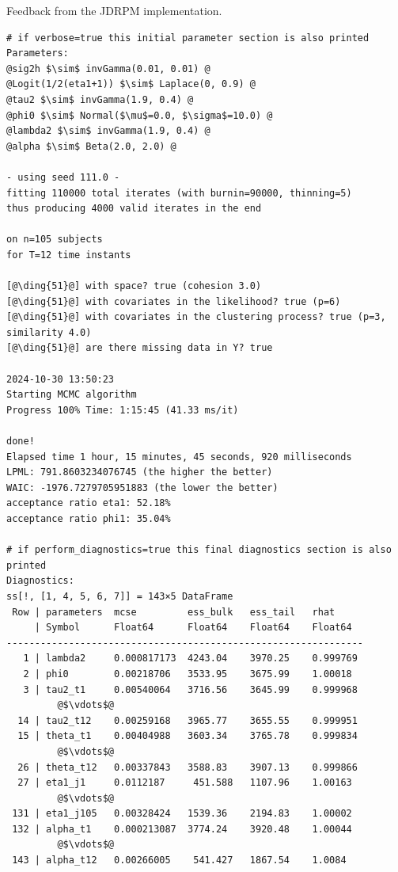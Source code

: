 \documentclass[12pt,	%
	a4paper,		%
	twoside,		%
	openright,		%
	titlepage,%
	]{book}
\theoremstyle{definition}
\newenvironment{code}{\captionsetup{type=listing}}{}
\begin{document}


\begin{code}
\caption[JDRPM interface feedback]{Feedback from the JDRPM implementation.}
    \begin{verbatim}
# if verbose=true this initial parameter section is also printed
Parameters:
@sig2h $\sim$ invGamma(0.01, 0.01) @
@Logit(1/2(eta1+1)) $\sim$ Laplace(0, 0.9) @
@tau2 $\sim$ invGamma(1.9, 0.4) @
@phi0 $\sim$ Normal($\mu$=0.0, $\sigma$=10.0) @
@lambda2 $\sim$ invGamma(1.9, 0.4) @
@alpha $\sim$ Beta(2.0, 2.0) @

- using seed 111.0 -
fitting 110000 total iterates (with burnin=90000, thinning=5)
thus producing 4000 valid iterates in the end

on n=105 subjects
for T=12 time instants

[@\ding{51}@] with space? true (cohesion 3.0)
[@\ding{51}@] with covariates in the likelihood? true (p=6)
[@\ding{51}@] with covariates in the clustering process? true (p=3, similarity 4.0)
[@\ding{51}@] are there missing data in Y? true

2024-10-30 13:50:23
Starting MCMC algorithm
Progress 100% Time: 1:15:45 (41.33 ms/it)

done!
Elapsed time 1 hour, 15 minutes, 45 seconds, 920 milliseconds
LPML: 791.8603234076745 (the higher the better)
WAIC: -1976.7279705951883 (the lower the better)
acceptance ratio eta1: 52.18%
acceptance ratio phi1: 35.04%

# if perform_diagnostics=true this final diagnostics section is also printed 
Diagnostics:
ss[!, [1, 4, 5, 6, 7]] = 143×5 DataFrame
 Row | parameters  mcse         ess_bulk   ess_tail   rhat
     | Symbol      Float64      Float64    Float64    Float64
---------------------------------------------------------------
   1 | lambda2     0.000817173  4243.04    3970.25    0.999769
   2 | phi0        0.00218706   3533.95    3675.99    1.00018
   3 | tau2_t1     0.00540064   3716.56    3645.99    0.999968
         @$\vdots$@
  14 | tau2_t12    0.00259168   3965.77    3655.55    0.999951
  15 | theta_t1    0.00404988   3603.34    3765.78    0.999834
         @$\vdots$@
  26 | theta_t12   0.00337843   3588.83    3907.13    0.999866  
  27 | eta1_j1     0.0112187     451.588   1107.96    1.00163
         @$\vdots$@
 131 | eta1_j105   0.00328424   1539.36    2194.83    1.00002
 132 | alpha_t1    0.000213087  3774.24    3920.48    1.00044
         @$\vdots$@
 143 | alpha_t12   0.00266005    541.427   1867.54    1.0084

\end{verbatim}
\end{code}
\end{document}
